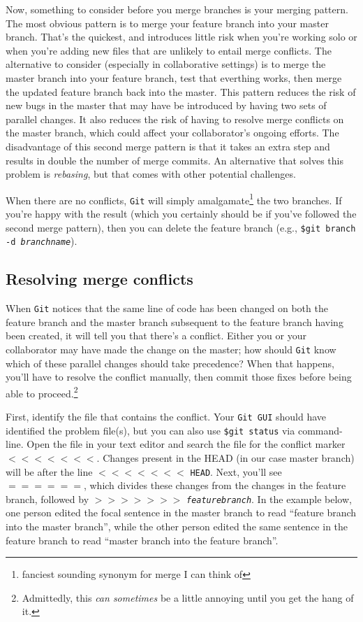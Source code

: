 \documentclass[12pt,letterpaper]{article}
\begin{document}
Now, something to consider before you merge branches is your merging pattern.
The most obvious pattern is to merge your feature branch into your master branch.
That's the quickest, and introduces little risk when you're working solo or when you're adding new files that are unlikely to entail merge conflicts.
The alternative to consider (especially in collaborative settings) is to merge the master branch into your feature branch, test that everthing works, then merge the updated feature branch back into the master.
This pattern reduces the risk of new bugs in the master that may have be introduced by having two sets of parallel changes.
It also reduces the risk of having to resolve merge conflicts on the master branch, which could affect your collaborator's ongoing efforts.
The disadvantage of this second merge pattern is that it takes an extra step and results in double the number of merge commits.
An alternative that solves this problem is \emph{rebasing}, but that comes with other potential challenges.

When there are no conflicts, \texttt{Git} will simply amalgamate\footnote{fanciest sounding synonym for merge I can think of} the two branches.
If you're happy with the result (which you certainly should be if you've followed the second merge pattern), then you can delete the feature branch (e.g., \texttt{\$git branch -d \emph{branchname}}).

\subsection{Resolving merge conflicts}

When \texttt{Git} notices that the same line of code has been changed on both the feature branch and the master branch subsequent to the feature branch having been created, it will tell you that there's a conflict.
Either you or your collaborator may have made the change on the master;
how should \texttt{Git} know which of these parallel changes should take precedence?
When that happens, you'll have to resolve the conflict manually, then commit those fixes before being able to proceed.\footnote{Admittedly, this \emph{can sometimes} be a little annoying until you get the hang of it.}

First, identify the file that contains the conflict.
Your \texttt{Git GUI} should have identified the problem file(s), but you can also use \texttt{\$git status} via command-line.
Open the file in your text editor and search the file for the conflict marker $<<<<<<<$.
Changes present in the HEAD (in our case master branch) will be after the line $<<<<<<<$ \texttt{HEAD}.
Next, you'll see $======$, which divides these changes from the changes in the feature branch, followed by $>>>>>>>$ \texttt{\emph{featurebranch}}.
In the example below, one person edited the focal sentence in the master branch to read ``feature branch into the master branch'', while the other person edited the same sentence in the feature branch to read ``master branch into the feature branch''.
\end{document}
